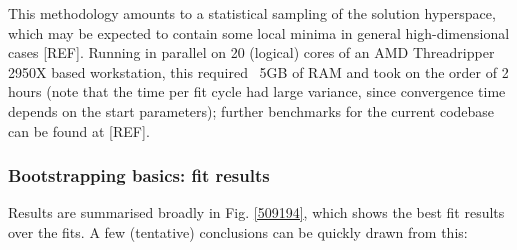 This methodology amounts to a statistical sampling of the solution hyperspace, which may be expected to contain some local minima in general high-dimensional cases [REF].  Running in parallel on 20 (logical) cores of an AMD Threadripper 2950X based workstation, this required ~5GB of RAM and took on the order of 2 hours (note that the time per fit cycle had large variance, since convergence time depends on the start parameters); further benchmarks for the current codebase can be found at [REF].


\subsubsection{Bootstrapping basics: fit results}

Results are summarised broadly in Fig. \ref{509194}, which shows the best fit results over the fits. A few (tentative) conclusions can be quickly drawn from this:


